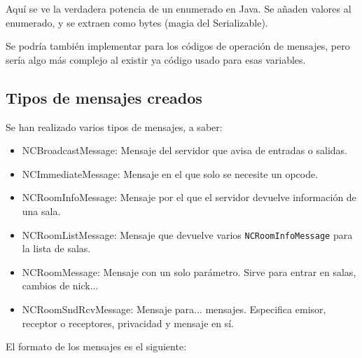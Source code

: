 \documentclass{article}
\begin{document}
Aquí se ve la verdadera potencia de un enumerado en Java. Se añaden valores al enumerado, y se extraen como bytes (magia del Serializable).

Se podría también implementar para los códigos de operación de mensajes, pero sería algo más complejo al existir ya código usado para esas variables.

\subsection{Tipos de mensajes creados}

Se han realizado varios tipos de mensajes, a saber:

\begin{itemize}
\item NCBroadcastMessage: Mensaje del servidor que avisa de entradas o salidas.
\item NCImmediateMessage: Mensaje en el que solo se necesite un opcode.
\item NCRoomInfoMessage: Mensaje por el que el servidor devuelve información de una sala.
\item NCRoomListMessage: Mensaje que devuelve varios \texttt{NCRoomInfoMessage} para la lista de salas.
\item NCRoomMessage: Mensaje con un solo parámetro. Sirve para entrar en salas, cambios de nick...
\item NCRoomSndRcvMessage: Mensaje para... mensajes. Especifica emisor, receptor o receptores, privacidad y mensaje en sí.
\end{itemize}


El formato de los mensajes es el siguiente:
\end{document}
